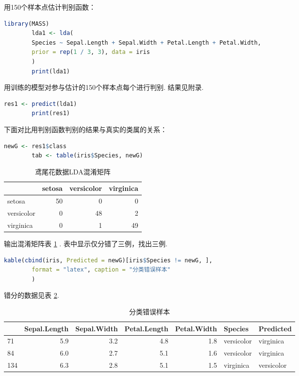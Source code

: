 \documentclass[12pt, a4paper, oneside]{ctexart}
\begin{document}
	用150个样本点估计判别函数：
	\begin{lstlisting}[language=R]
		library(MASS)
		lda1 <- lda(
		Species ~ Sepal.Length + Sepal.Width + Petal.Length + Petal.Width,
		prior = rep(1 / 3, 3), data = iris
		)
		print(lda1)
	\end{lstlisting}
	
	用训练的模型对参与估计的150个样本点每个进行判别. 结果见附录.
	\begin{lstlisting}[language=R]
		res1 <- predict(lda1)
		print(res1)
	\end{lstlisting}
	
	下面对比用判别函数判别的结果与真实的类属的关系：
	\begin{lstlisting}[language=R]
		newG <- res1$class
		tab <- table(iris$Species, newG)
	\end{lstlisting}
	\begin{table}

		\caption{鸢尾花数据LDA混淆矩阵}
		\centering
		\begin{tabular}[t]{l|r|r|r}
			\hline
			& setosa & versicolor & virginica\\
			\hline
			setosa & 50 & 0 & 0\\
			\hline
			versicolor & 0 & 48 & 2\\
			\hline
			virginica & 0 & 1 & 49\\
			\hline
		\end{tabular}
		\label{table:IrisLDA}
	\end{table}
	输出混淆矩阵表 \ref{table:IrisLDA} . 表中显示仅分错了三例，找出三例.
	\begin{lstlisting}[language=R]
		kable(cbind(iris, Predicted = newG)[iris$Species != newG, ],
		format = "latex", caption = "分类错误样本"
		)
	\end{lstlisting}
	错分的数据见表 \ref{table:misclassify}.
	\begin{table}
		
		\caption{分类错误样本}
		\centering
		\begin{tabular}[t]{l|r|r|r|r|l|l}
			\hline
			& Sepal.Length & Sepal.Width & Petal.Length & Petal.Width & Species & Predicted\\
			\hline
			71 & 5.9 & 3.2 & 4.8 & 1.8 & versicolor & virginica\\
			\hline
			84 & 6.0 & 2.7 & 5.1 & 1.6 & versicolor & virginica\\
			\hline
			134 & 6.3 & 2.8 & 5.1 & 1.5 & virginica & versicolor\\
			\hline
		\end{tabular}
		\label{table:misclassify}
	\end{table}
\end{document}
